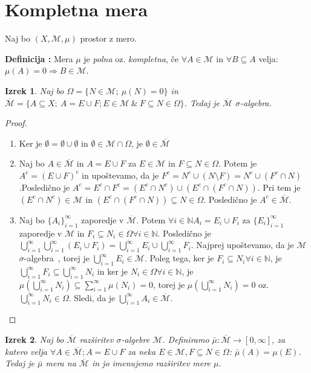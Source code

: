 \documentclass[a4paper, 10pt]{article}
\newtheorem{izr}{Izrek}
\newcounter{defcount}
\newenvironment{definicija}{\begin{flushleft}\stepcounter{defcount}\textbf{Definicija \arabic{defcount}:}}{\hfill\end{flushleft}}
\newcommand{\mth}[1]{\ensuremath{\mathbb{#1}}}
\newcommand{\N}{\mth{N}}
\newcommand{\Mu}{\mathcal{M}}
\newcommand{\sigalg}{$\sigma$-algebra~}
\newcommand{\pojem}[1]{\emph{#1}}
\newcommand{\map}[3]{\ensuremath{{#1}: {#2} \rightarrow {#3}}}
\begin{document}
		\section{Kompletna mera}
		Naj bo $(X, \Mu, \mu)$ prostor z mero.
		\begin{definicija}
			Mera $\mu$ je \pojem{polna} oz. \pojem{kompletna}, če $\forall A\in \Mu$ in $\forall B \subseteq A$ velja: $\mu(A) = 0 \Rightarrow B\in\Mu$.
		\end{definicija}
		\begin{izr}
			Naj bo $\Omega = \{N\in\Mu ;~ \mu(N) = 0\}$ in $\overline{\Mu} = \{A\subseteq X;~ A = E\cup F; E\in \Mu ~\&~ F\subseteq N\in\Omega\}$. Tedaj je $\overline{\Mu}$ $\sigma$-algebra.
		\end{izr}
		\begin{proof}
			\begin{enumerate}
				\item Ker je $\emptyset = \emptyset \cup \emptyset$ in $\emptyset\in \Mu\cap\Omega$, je $\emptyset\in \overline{\Mu}$
				\item Naj bo $A\in\overline{\Mu}$ in $A = E\cup F$ za $E\in\Mu$ in $F\subseteq N\in\Omega$. Potem je $A^c = (E\cup F)^c$ in upoštevamo, da je $F^c = N^c \cup (N\setminus F) = N^c \cup (F^c \cap N)$.Posledično je $A^c = E^c \cap F^c = (E^c \cap N^c)\cup (E^c \cap (F^c \cap N))$. Pri tem je $(E^c \cap N^c) \in \Mu$ in $(E^c \cap (F^c \cap N)) \subseteq N \in \Omega$. Posledično je $A^c\in \overline{\Mu}$.
				\item Naj bo $\{A_i\}_{i = 1}^{\infty}$ zaporedje v $\overline{\Mu}$. Potem $\forall i\in\N A_i = E_i\cup F_i$ za $\{E_i\}_{i =1}^{\infty}$ zaporedje v $\Mu$ in $F_i\subseteq N_i \in \Omega \forall i\in\N$. Posledično je $\bigcup_{i = 1}^{\infty}\bigcup_{i = 1}^{\infty} (E_i \cup F_i) = \bigcup_{i = 1}^{\infty} E_i \cup \bigcup_{i = 1}^{\infty} F_i$. Najprej upoštevamo, da je $\Mu$ \sigalg, torej je $\bigcup_{i = 1}^{\infty} E_i \in \Mu$. Poleg tega, ker je $F_i \subseteq N_i \forall i\in\N$, je $\bigcup_{i = 1}^{\infty} F_i \subseteq \bigcup_{i = 1}^{\infty} N_i$ in ker je $N_i\in\Omega \forall i\in\N$, je $\mu(\bigcup_{i = 1}^{\infty} N_i) \subseteq \sum_{i = 1}^{\infty} \mu(N_i) = 0$, torej je $\mu(\bigcup_{i = 1}^{\infty} N_i) = 0$ oz. $\bigcup_{i = 1}^{\infty} N_i \in \Omega$. Sledi, da je $\bigcup_{i = 1}^{\infty} A_i \in \overline{\Mu}$.
			\end{enumerate}
		\end{proof}
		\begin{izr}
			Naj bo $\overline{\Mu}$ razširitev $\sigma$-algebre $\Mu$. Definiramo $\map{\bar{\mu}}{\overline{\Mu}}{[0, \infty]}$, za katero velja $\forall A\in \overline{\Mu}; A= E\cup F$ za neka $E\in \Mu, F\subseteq N\in\Omega$: $\bar{\mu}(A) = \mu(E)$. Tedaj je $\bar{\mu}$ mera na $\overline{\Mu}$ in jo imenujemo \pojem{razširitev} mere $\mu$.
		\end{izr}
\end{document}
